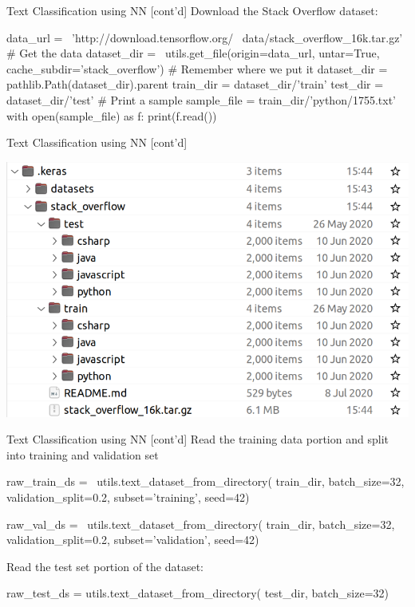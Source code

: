 \documentclass[ignorenonframetext,xcolor=x11names]{beamer}
\begin{document}
\begin{frame}[fragile]{Text Classification using NN \small [cont'd]}
Download the Stack Overflow dataset:
\begin{pythoncode}
data_url = \
'http://download.tensorflow.org/ \
data/stack_overflow_16k.tar.gz'
# Get the data
dataset_dir = \
utils.get_file(origin=data_url,
               untar=True,
               cache_subdir='stack_overflow')
# Remember where we put it
dataset_dir = pathlib.Path(dataset_dir).parent
train_dir = dataset_dir/'train'
test_dir = dataset_dir/'test'
# Print a sample
sample_file = train_dir/'python/1755.txt'
with open(sample_file) as f:
  print(f.read())
\end{pythoncode}
\end{frame}


\begin{frame}[fragile]{Text Classification using NN \small [cont'd]}
\centering

\includegraphics[width=.8\textwidth]{screen9.png}
\end{frame}

\begin{frame}[fragile]{Text Classification using NN \small [cont'd]}
Read the training data portion and split into training and validation set
\begin{pythoncode}
raw_train_ds = \
utils.text_dataset_from_directory(
    train_dir, batch_size=32,
    validation_split=0.2,
    subset='training', seed=42)
    
raw_val_ds = \
utils.text_dataset_from_directory(
    train_dir, batch_size=32,
    validation_split=0.2,
    subset='validation', seed=42)
\end{pythoncode}
Read the test set portion of the dataset:
\begin{pythoncode}
raw_test_ds = utils.text_dataset_from_directory(
    test_dir, batch_size=32)
\end{pythoncode}
\end{frame}
\end{document}
